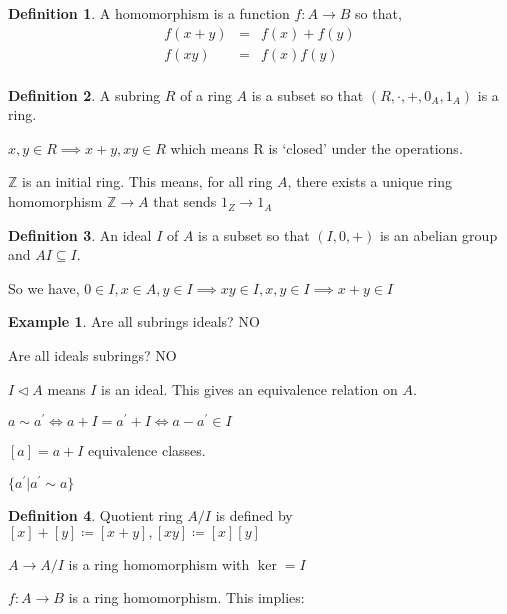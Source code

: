 \documentclass{article}
\theoremstyle{definition}
\newtheorem{example}{Example}
\newtheorem{definition}{Definition}
\begin{document}
\begin{definition}
    A homomorphism is a function \(f:A\to B\) so that,
    \[
        \begin{array}{ccc}
            f(x+y) & = &  f(x)+f(y) \\
            f(xy) & = & f(x)f(y)  \\
        \end{array}
    \] 
\end{definition}

\begin{definition}
    A subring \(R\) of a ring \(A\) is a subset so that \((R,\cdot,+,0_{A},1_{A})\) is a ring.

    \(x,y\in R\implies x+y,xy\in R\) which means R is `closed' under the operations.

    \(\mathbb{Z} \) is an initial ring. This means, for all ring \(A\), there exists a unique ring homomorphism \(\mathbb{Z} \to A\) that sends \(1_{Z} \to 1_{A}\)    
\end{definition}

\begin{definition}
    An ideal \(I\) of \(A\) is a subset so that \((I,0,+)\) is an abelian group and \(AI \subseteq I\).

    So we have, \(0\in I, x\in A,y\in I\implies xy\in I, x,y\in I\implies x+y\in I\) 

\end{definition}

\begin{example}
    Are all subrings ideals? NO

    Are all ideals subrings? NO
\end{example}

\(I\triangleleft A\) means \(I\) is an ideal. This gives an equivalence relation on \(A\).

\(a \sim a^{\prime} \iff a+I=a^{\prime} +I\iff a-a^{\prime} \in I\)

\([a]=a+I\) equivalence classes.

\(\{a^{\prime} |a^{\prime} \sim a\}\)

\begin{definition}
    Quotient ring \(A/I\) is defined by \([x]+[y]\coloneqq [x+y],[xy]\coloneqq [x][y]\) 
\end{definition}

\(A\to A/I\) is a ring homomorphism with \(\ker =I\)

\(f:A\to B\) is a ring homomorphism. This implies:
\end{document}
